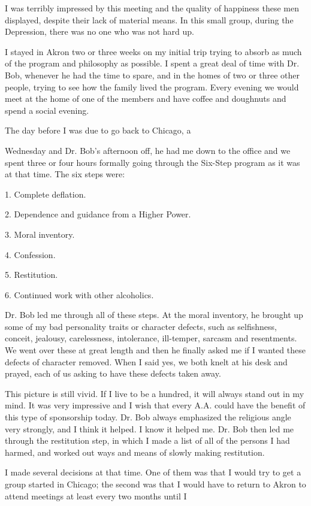 I was terribly impressed by this meeting and the quality of happiness these men displayed, despite their lack of material means. In this small group, during the Depression, there was no one who was not hard up.

I stayed in Akron two or three weeks on my initial trip trying to absorb as much of the program and philosophy as possible. I spent a great deal of time with Dr. Bob, whenever he had the time to spare, and in the homes of two or three other people, trying to see how the family lived the program. Every evening we would meet at the home of one of the members and have coffee and doughnuts and spend a social evening.

The day before I was due to go back to Chicago, a

Wednesday and Dr. Bob’s afternoon off, he had me down to the office and we spent three or four hours formally going through the Six-Step program as it was at that time. The six steps were:

1. Complete deflation.

2. Dependence and guidance from a Higher Power.

3. Moral inventory.

4. Confession.

5. Restitution.

6. Continued work with other alcoholics.

Dr. Bob led me through all of these steps. At the moral inventory, he brought up some of my bad personality traits or character defects, such as selfishness, conceit, jealousy, carelessness, intolerance, ill-temper, sarcasm and resentments. We went over these at great length and then he finally asked me if I wanted these defects of character removed. When I said yes, we both knelt at his desk and prayed, each of us asking to have these defects taken away.

This picture is still vivid. If I live to be a hundred, it will always stand out in my mind. It was very impressive and I wish that every A.A. could have the benefit of this type of sponsorship today. Dr. Bob always emphasized the religious angle very strongly, and I think it helped. I know it helped me. Dr. Bob then led me through the restitution step, in which I made a list of all of the persons I had harmed, and worked out ways and means of slowly making restitution.

I made several decisions at that time. One of them was that I would try to get a group started in Chicago; the second was that I would have to return to Akron to attend meetings at least every two months until I

